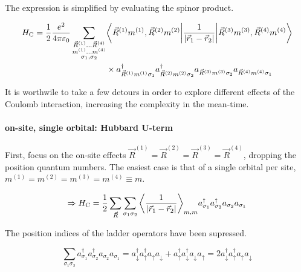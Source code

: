 \documentclass[../../main.tex]{subfiles}
\begin{document}
The expression is simplified by evaluating the spinor product.

\begin{equation}
\begin{split}
	H_{\text{C}} = \frac12 \frac{e^2}{4\pi\varepsilon_0} \sum_{\substack{\vec{R}^{(1)} ... \vec{R}^{(4)} \\ m^{(1)} ... m^{(4)} \\ \sigma_1, \sigma_2 }} &\bigg\langle \vec{R}^{(1)} m^{(1)}, \vec{R}^{(2)} m^{(2)} \bigg| \frac{1}{\abs{\vec{r}_1-\vec{r}_2}} \bigg | \vec{R}^{(3)} m^{(3)}, \vec{R}^{(4)} m^{(4)} \bigg\rangle  \\
	&\times a_{\vec{R}^{(1)} m^{(1)} \sigma_1}^\dagger a_{\vec{R}^{(2)} m^{(2)} \sigma_2}^\dagger a_{\vec{R}^{(3)} m^{(3)} \sigma_2} a_{\vec{R}^{(4)} m^{(4)} \sigma_1} 
\end{split}
\end{equation}

It is worthwile to take a few detours in order to explore different effects of the Coulomb interaction, increasing the complexity in the mean-time. 

\paragraph{on-site, single orbital: Hubbard U-term} 

\hfill \newline

First, focus on the on-site effects $\vec{R}^{(1)} = \vec{R}^{(2)} = \vec{R}^{(3)} = \vec{R}^{(4)}$, dropping the position quantum numbers. The easiest case is that of a single orbital per site, $m^{(1)} = m^{(2)} = m^{(3)} = m^{(4)} \equiv m$.

\begin{equation}
\Rightarrow H_{\text{C}} = \frac12 \sum_{\vec{R}}\sum_{\sigma_1 \sigma_2} \bigg\langle \frac{1}{\abs{\vec{r}_1-\vec{r}_2}} \bigg\rangle_{m,m} a_{\sigma_1}^\dagger a_{\sigma_2}^\dagger a_{\sigma_2} a_{\sigma_1}
\end{equation}

The position indices of the ladder operators have been supressed.

\begin{equation}
	\sum_{\sigma_1 \sigma_2} a_{\sigma_1}^\dagger a_{\sigma_2}^\dagger a_{\sigma_2} a_{\sigma_1} = a_{\downarrow}^\dagger a_{\uparrow}^\dagger a_{\uparrow} a_{\downarrow} + a_{\uparrow}^\dagger a_{\downarrow}^\dagger a_\downarrow a_\uparrow = 2a_{\downarrow}^\dagger a_{\uparrow}^\dagger a_{\uparrow} a_{\downarrow}
\end{equation}
\end{document}
